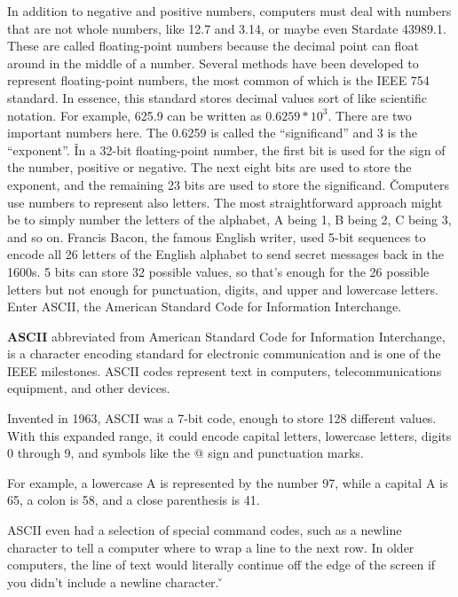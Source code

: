 In addition to negative and positive numbers, computers must deal with numbers that are not whole numbers, like 12.7
and 3.14, or maybe even Stardate 43989.1. These are called floating-point numbers because the decimal point can float
around in the middle of a number. Several methods have been developed to represent floating-point numbers, the most
common of which is the IEEE 754 standard. In essence, this standard stores decimal values sort of like scientific
notation. For example, 625.9 can be written as $0.6259 * 10^3$. There are two important numbers here. The 0.6259 is
called the ``significand'' and 3 is the ``exponent''. \v

In a 32-bit floating-point number, the first bit is used for the sign of the number, positive or negative. The next
eight bits are used to store the exponent, and the remaining 23 bits are used to store the significand. \v

Computers use numbers to represent also letters. The most straightforward approach might be to simply number the
letters of the alphabet, A being 1, B being 2, C being 3, and so on. Francis Bacon, the famous English writer, used
5-bit sequences to encode all 26 letters of the English alphabet to send secret messages back in the 1600s. 5 bits
can store 32 possible values, so that's enough for the 26 possible letters but not enough for punctuation, digits,
and upper and lowercase letters. Enter ASCII, the American Standard Code for Information Interchange.

\bd[ASCII]
\textbf{ASCII} abbreviated from American Standard Code for Information Interchange, is a character encoding standard
for electronic communication and is one of the IEEE milestones. ASCII codes represent text in computers,
telecommunications equipment, and other devices.
\ed

Invented in 1963, ASCII was a 7-bit code, enough to store 128 different values. With this expanded range, it could
encode capital letters, lowercase letters, digits 0 through 9, and symbols like the @ sign and punctuation marks.

\be
For example, a lowercase A is represented by the number 97, while a capital A is 65, a colon is 58, and a close
parenthesis is 41.
\ee

ASCII even had a selection of special command codes, such as a newline character to tell a computer where to wrap a
line to the next row. In older computers, the line of text would literally continue off the edge of the screen if you
didn't include a newline character. \v

